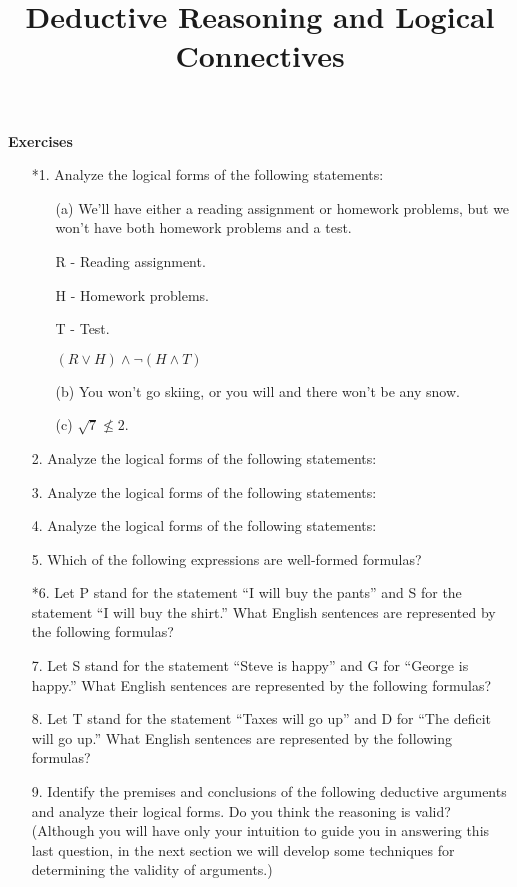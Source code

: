 \documentclass{article}
\title{Deductive Reasoning and Logical Connectives}
\begin{document}
\textbf{Exercises}
\begin{itemize}
    \item[*1.] Analyze the logical forms of the following statements:
    \begin{itemize}
        \item[(a)] We'll have either a reading assignment or homework problems, but we won't have both homework problems and a test.
        \item[] R - Reading assignment.
        \item[] H - Homework problems.
        \item[] T - Test.
        \item[] $(R \lor H)\land \neg(H \land T)$
        \item[(b)] You won't go skiing, or you will and there won't be any snow.
        \item[(c)] $\sqrt{7} \nleqslant 2$.
    \end{itemize}
    \item[2.] Analyze the logical forms of the following statements:
    \item[3.] Analyze the logical forms of the following statements:
    \item[4.] Analyze the logical forms of the following statements:
    \item[5.] Which of the following expressions are well-formed formulas?
    \item[*6.] Let P stand for the statement “I will buy the pants” and S for the statement “I will buy the shirt.” What English sentences are represented by the following formulas?
    \item[7.] Let S stand for the statement “Steve is happy” and G for “George is happy.” What English sentences are represented by the following formulas?
    \item[8.] Let T stand for the statement “Taxes will go up” and D for “The deficit will go up.” What English sentences are represented by the following formulas?
    \item[9.] Identify the premises and conclusions of the following deductive arguments and analyze their logical forms. Do you think the reasoning is valid? (Although you will have only your intuition to guide you in answering this last question, in the next section we will develop some techniques for determining the validity of arguments.)
\end{itemize}
\end{document}

